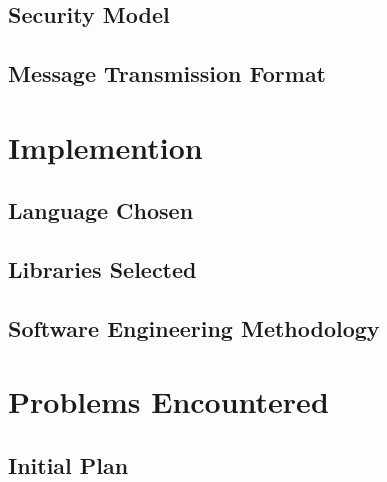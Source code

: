 \documentclass[a4paper,12pt]{report}
\begin{document}


\clearpage

\section{Security Model}



\section{Message Transmission Format}




\chapter{Implemention}

\section{Language Chosen}



\section{Libraries Selected}



\section{Software Engineering Methodology}




\chapter{Problems Encountered}

\section{Initial Plan}




\end{document}
